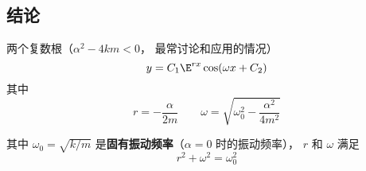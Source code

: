 
\subsection{结论}
两个复数根（$\alpha ^2 - 4km < 0$， 最常讨论和应用的情况）
\begin{equation}
y = C_1 \E^{rx} \cos(\omega x + C_2)
\end{equation}
其中
\begin{equation}
r =  - \frac{\alpha }{2m} \qquad  \omega  = \sqrt{\omega_0^2 - \frac{\alpha ^2}{4 m^2}}
\end{equation}

其中 $\omega_0 = \sqrt{k/m}$ 是\textbf{固有振动频率}（$\alpha  = 0$ 时的振动频率）， $r$ 和 $\omega$ 满足
\begin{equation}
r^2 + \omega ^2 = \omega_0^2
\end{equation}

